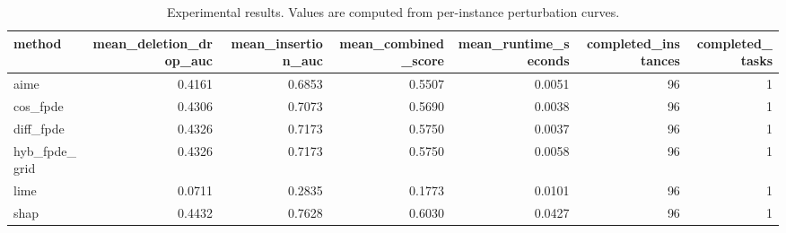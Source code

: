 \begin{table}[t]
\caption{Experimental results. Values are computed from per-instance perturbation curves.}
\label{tab:main_results_computed}
\centering
\begin{tabular}{lrrrrrr}
\toprule
method & mean\_deletion\_drop\_auc & mean\_insertion\_auc & mean\_combined\_score & mean\_runtime\_seconds & completed\_instances & completed\_tasks \\
\midrule
aime & 0.4161 & 0.6853 & 0.5507 & 0.0051 & 96 & 1 \\
cos\_fpde & 0.4306 & 0.7073 & 0.5690 & 0.0038 & 96 & 1 \\
diff\_fpde & 0.4326 & 0.7173 & 0.5750 & 0.0037 & 96 & 1 \\
hyb\_fpde\_grid & 0.4326 & 0.7173 & 0.5750 & 0.0058 & 96 & 1 \\
lime & 0.0711 & 0.2835 & 0.1773 & 0.0101 & 96 & 1 \\
shap & 0.4432 & 0.7628 & 0.6030 & 0.0427 & 96 & 1 \\
\bottomrule
\end{tabular}

\end{table}
